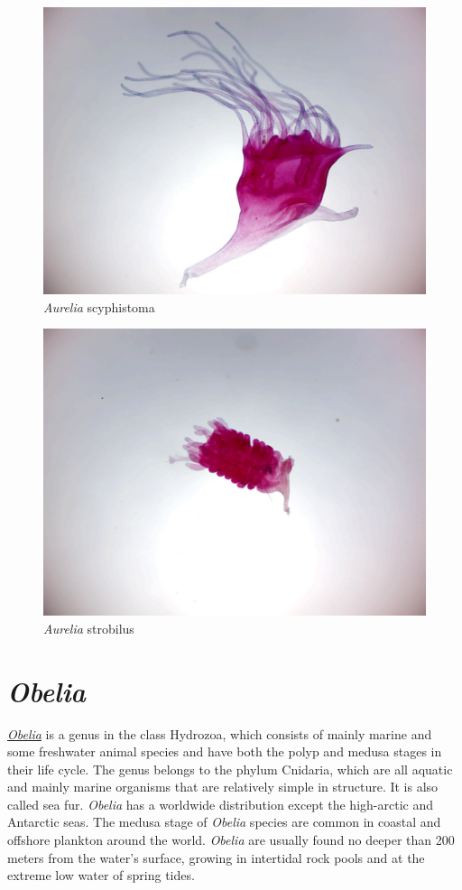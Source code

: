 \begin{figure}

{\centering \includegraphics[width=0.7\linewidth]{./figures/porifera/aurelia_scyphistoma}

}

\caption{\emph{Aurelia} scyphistoma}\label{fig:scyphistoma}
\end{figure}

\begin{figure}

{\centering \includegraphics[width=0.7\linewidth]{./figures/porifera/aurelia_strobilus}

}

\caption{\emph{Aurelia} strobilus}\label{fig:strobilus}
\end{figure}

\section{\texorpdfstring{\emph{Obelia}}{Obelia}}\label{obelia}

\href{https://en.wikipedia.org/wiki/Obelia}{\emph{Obelia}} is a genus in the
class Hydrozoa, which consists of mainly marine and some freshwater
animal species and have both the polyp and medusa stages in their life
cycle. The genus belongs to the phylum Cnidaria, which are all aquatic
and mainly marine organisms that are relatively simple in structure. It
is also called sea fur. \emph{Obelia} has a worldwide distribution except the
high-arctic and Antarctic seas. The medusa stage of \emph{Obelia} species are
common in coastal and offshore plankton around the world. \emph{Obelia} are
usually found no deeper than 200 meters from the water's surface,
growing in intertidal rock pools and at the extreme low water of spring
tides.

